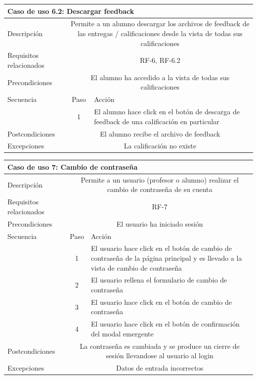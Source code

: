 \hspace{3cm}

\begin{tabular}[H]{l c l}
\toprule 
\multicolumn{3}{l}{\textbf{Caso de uso 6.2: Descargar feedback}}\\
\midrule
Descripción & \multicolumn{2}{p{10cm}}{Permite a un alumno descargar los archivos de feedback de las entregas / calificaciones desde la vista de todas sus calificaciones}\\
\midrule
Requisitos relacionados & \multicolumn{2}{p{10cm}}{RF-6, RF-6.2}\\
\midrule
Precondiciones & \multicolumn{2}{p{10cm}}{El alumno ha accedido a la vista de todas sus calificaciones}\\
\midrule
Secuencia & Paso & Acción \\
\cmidrule{2-3}
         & 1 &  \multicolumn{1}{p{8cm}}{El alumno hace click en el botón de descarga de feedback de una calificación en particular}\\
         
\midrule
Postcondiciones & \multicolumn{2}{p{10cm}}{El alumno recibe el archivo de feedback}\\
\midrule
Excepciones  & \multicolumn{2}{p{10cm}}{La calificación no existe}\\
\bottomrule 
\end{tabular}


\hspace{3cm}

\begin{tabular}[H]{l c l}
\toprule 
\multicolumn{3}{l}{\textbf{Caso de uso 7: Cambio de contraseña}}\\
\midrule
Descripción & \multicolumn{2}{p{10cm}}{Permite a un usuario (profesor o alumno) realizar el cambio de contraseña de su cuenta}\\
\midrule
Requisitos relacionados & \multicolumn{2}{p{10cm}}{RF-7}\\
\midrule
Precondiciones & \multicolumn{2}{p{10cm}}{El usuario ha iniciado sesión}\\
\midrule
Secuencia & Paso & Acción \\
\cmidrule{2-3}
         & 1 &  \multicolumn{1}{p{8cm}}{El usuario hace click en el botón de cambio de contraseña de la página principal y es llevado a la vista de cambio de contraseña}\\
         & 2 &  \multicolumn{1}{p{8cm}}{El usuario rellena el formulario de cambio de contraseña}\\
         & 3 &  \multicolumn{1}{p{8cm}}{El usuario hace click en el botón de cambio de contraseña}\\
         & 4 &  \multicolumn{1}{p{8cm}}{El usuario hace click en el botón de confirmación del modal emergente}\\
         
\midrule
Postcondiciones & \multicolumn{2}{p{10cm}}{La contraseña es cambiada y se produce un cierre de sesión llevandose al usuario al login}\\
\midrule
Excepciones  & \multicolumn{2}{p{10cm}}{Datos de entrada incorrectos}\\
\bottomrule 
\end{tabular}


